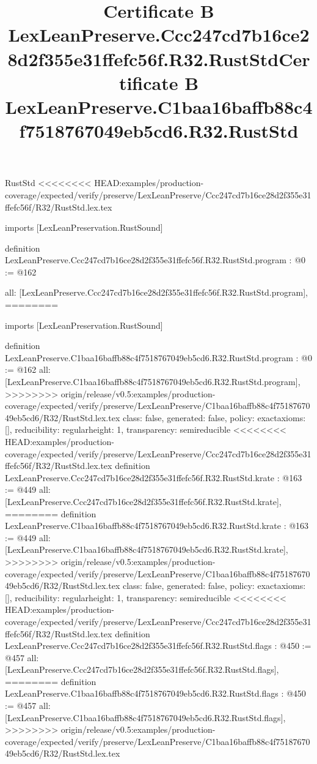 \begin{lexlean}{RustStd}
<<<<<<<< HEAD:examples/production-coverage/expected/verify/preserve/LexLeanPreserve/Ccc247cd7b16ce28d2f355e31ffefc56f/R32/RustStd.lex.tex
\title{Certificate B LexLeanPreserve.Ccc247cd7b16ce28d2f355e31ffefc56f.R32.RustStd}
\begin{coremodule}
imports [LexLeanPreservation.RustSound]

definition LexLeanPreserve.Ccc247cd7b16ce28d2f355e31ffefc56f.R32.RustStd.program : @0 := @162 {
  all: [LexLeanPreserve.Ccc247cd7b16ce28d2f355e31ffefc56f.R32.RustStd.program],
========
\title{Certificate B LexLeanPreserve.C1baa16baffb88c4f7518767049eb5cd6.R32.RustStd}
\begin{coremodule}
imports [LexLeanPreservation.RustSound]

definition LexLeanPreserve.C1baa16baffb88c4f7518767049eb5cd6.R32.RustStd.program : @0 := @162 {
  all: [LexLeanPreserve.C1baa16baffb88c4f7518767049eb5cd6.R32.RustStd.program],
>>>>>>>> origin/release/v0.5:examples/production-coverage/expected/verify/preserve/LexLeanPreserve/C1baa16baffb88c4f7518767049eb5cd6/R32/RustStd.lex.tex
  class: false,
  generated: false,
  policy: exact{axioms: []},
  reducibility: regular{height: 1},
  transparency: semireducible
}
<<<<<<<< HEAD:examples/production-coverage/expected/verify/preserve/LexLeanPreserve/Ccc247cd7b16ce28d2f355e31ffefc56f/R32/RustStd.lex.tex
definition LexLeanPreserve.Ccc247cd7b16ce28d2f355e31ffefc56f.R32.RustStd.krate : @163 := @449 {
  all: [LexLeanPreserve.Ccc247cd7b16ce28d2f355e31ffefc56f.R32.RustStd.krate],
========
definition LexLeanPreserve.C1baa16baffb88c4f7518767049eb5cd6.R32.RustStd.krate : @163 := @449 {
  all: [LexLeanPreserve.C1baa16baffb88c4f7518767049eb5cd6.R32.RustStd.krate],
>>>>>>>> origin/release/v0.5:examples/production-coverage/expected/verify/preserve/LexLeanPreserve/C1baa16baffb88c4f7518767049eb5cd6/R32/RustStd.lex.tex
  class: false,
  generated: false,
  policy: exact{axioms: []},
  reducibility: regular{height: 1},
  transparency: semireducible
}
<<<<<<<< HEAD:examples/production-coverage/expected/verify/preserve/LexLeanPreserve/Ccc247cd7b16ce28d2f355e31ffefc56f/R32/RustStd.lex.tex
definition LexLeanPreserve.Ccc247cd7b16ce28d2f355e31ffefc56f.R32.RustStd.flags : @450 := @457 {
  all: [LexLeanPreserve.Ccc247cd7b16ce28d2f355e31ffefc56f.R32.RustStd.flags],
========
definition LexLeanPreserve.C1baa16baffb88c4f7518767049eb5cd6.R32.RustStd.flags : @450 := @457 {
  all: [LexLeanPreserve.C1baa16baffb88c4f7518767049eb5cd6.R32.RustStd.flags],
>>>>>>>> origin/release/v0.5:examples/production-coverage/expected/verify/preserve/LexLeanPreserve/C1baa16baffb88c4f7518767049eb5cd6/R32/RustStd.lex.tex
}}}
\end{coremodule}}
\end{coremodule}
\end{lexlean}
